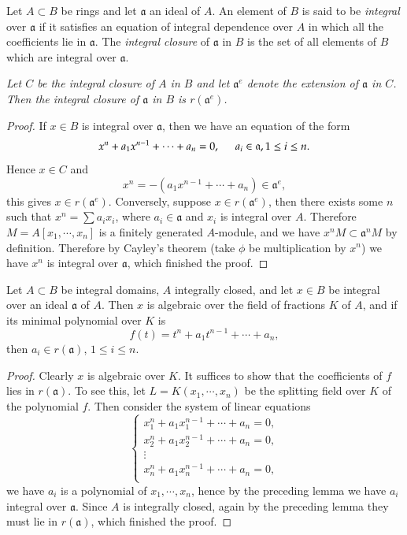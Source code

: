 Let $A\subset B$ be rings and let $\mathfrak{a}$ an ideal of $A$. An element of $B$ is said to be \textit{integral} over $\mathfrak{a}$ if it satisfies an equation of integral dependence over $A$ in which all the coefficients lie in $\mathfrak{a}$. The \textit{integral closure} of $\mathfrak{a}$ in $B$ is the set of all elements of $B$ which are integral over $\mathfrak{a}$.
\begin{lemma}\em
Let $C$ be the integral closure of $A$ in $B$ and let $\mathfrak{a}^e$ denote the extension of $\mathfrak{a}$ in $C$. Then the integral closure of $\mathfrak{a}$ in $B$ is $r(\mathfrak{a}^e)$.
\end{lemma}
\begin{proof}
If $x\in B$ is integral over $\mathfrak{a}$, then we have an equation of the form 
$$
x^n+a_1x^{n-1}+\cdots +a_n=0,\hspace{0.5cm}a_i\in \mathfrak{a} ,1\le i\le n.
$$
Hence $x\in C$ and 
$$
x^n=-\left( a_1x^{n-1}+\cdots +a_n \right) \in \mathfrak{a} ^e,
$$
this gives $x\in r(\mathfrak{a}^e)$. Conversely, suppose $x\in r(\mathfrak{a}^e)$, then there exists some $n$ such that $x^n=\sum a_ix_i$, where $a_i\in\mathfrak{a}$ and $x_i$ is integral over $A$. Therefore $M=A[x_1,\cdots,x_n]$ is a finitely generated $A$-module, and we have $x^nM\subset\mathfrak{a}^nM$ by definition. Therefore by Cayley's theorem (take $\phi$ be multiplication by $x^n$) we have $x^n$ is integral over $\mathfrak{a}$, which finished the proof.
\end{proof}
\begin{proposition}
Let $A\subset B$ be integral domains, $A$ integrally closed, and let $x\in B$ be integral over an ideal $\mathfrak{a}$ of $A$. Then $x$ is algebraic over the field of fractions $K$ of $A$, and if its minimal polynomial over $K$ is 
$$
f\left( t \right) =t^n+a_1t^{n-1}+\cdots +a_n,
$$
then $a_i\in r(\mathfrak{a})$, $1\le i\le n$.
\end{proposition}
\begin{proof}
Clearly $x$ is algebraic over $K$. It suffices to show that the coefficients of $f$ lies in $r(\mathfrak{a})$. To see this, let $L=K(x_1,\cdots,x_n)$ be the splitting field over $K$ of the polynomial $f$. Then consider the system of linear equations 
$$
\begin{cases}
	x_{1}^{n}+a_1x_{1}^{n-1}+\cdots +a_n=0,\\
	x_{2}^{n}+a_1x_{2}^{n-1}+\cdots +a_n=0,\\
	\vdots\\
	x_{n}^{n}+a_1x_{n}^{n-1}+\cdots +a_n=0,\\
\end{cases}
$$
we have $a_i$ is a polynomial of $x_1,\cdots,x_n$, hence by the preceding lemma we have $a_i$ integral over $\mathfrak{a}$. Since $A$ is integrally closed, again by the preceding lemma they must lie in $r(\mathfrak{a})$, which finished the proof.
\end{proof}
